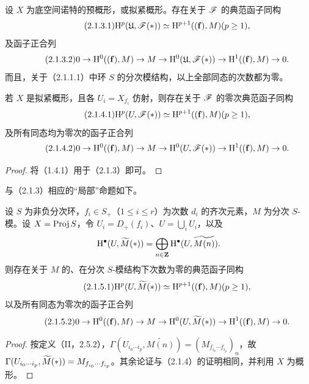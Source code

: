 设 $X$ 为底空间诺特的预概形，或拟紧概形。存在关于 $\mathscr F$ 的典范函子同构
\begin{equation}\tag{2.1.3.1}
\mathrm H^p(\mathfrak U,\mathscr F(*))\simeq\mathrm H^{p+1}((\mathbf f),M)(p\geq1),
\end{equation}
及函子正合列
\begin{equation}\tag{2.1.3.2}
0\to\mathrm H^0((\mathbf f),M)\to M\to\mathrm H^0(\mathfrak U,\mathscr F(*))
\to\mathrm H^1((\mathbf f),M)\to0.
\end{equation}
而且，关于（2.1.1.1）中环 $S$ 的分次模结构，以上全部同态的次数都为零。

若 $X$ 是拟紧概形，且各 $U_i=X_{f_i}$ 仿射，则存在关于 $\mathscr F$ 的零次典范函子同构
\begin{equation}\tag{2.1.4.1}
\mathrm H^p(U,\mathscr F(*))\simeq\mathrm H^{p+1}((\mathbf f),M)(p\geq1),
\end{equation}
及所有同态均为零次的函子正合列
\begin{equation}\tag{2.1.4.2}
0\to\mathrm H^0((\mathbf f),M)\to M\to\mathrm H^0(U,\mathscr F(*))
\to\mathrm H^1((\mathbf f),M)\to0.
\end{equation}
\begin{proof}将（1.4.1）用于（2.1.3）即可。\end{proof}
与（2.1.3）相应的“局部”命题如下。

设 $S$ 为非负分次环，$f_i\in S_+$（$1\leq i\leq r$）为次数 $d_i$ 的齐次元素，$M$ 为分次 $S$-模。设 $X=\operatorname{Proj} S$，令 $U_i=D_+(f_i)$、$U=\bigcup_iU_i$，以及
\[
\mathrm H^\bullet(U,\widetilde{M}(*))=\bigoplus_{n\in\mathbf Z}\mathrm H^\bullet(U,\widetilde{M(n)}).
\]
则存在关于 $M$ 的、在分次 $S$-模结构下次数为零的典范函子同构
\begin{equation}\tag{2.1.5.1}
\mathrm H^p(U,\widetilde{M}(*))\simeq\mathrm H^{p+1}((\mathbf f),M)(p\geq1),
\end{equation}
以及所有同态为零次的函子正合列
\begin{equation}\tag{2.1.5.2}
0\to\mathrm H^0((\mathbf f),M)\to M\to\mathrm H^0(U,\widetilde{M}(*))
\to\mathrm H^1((\mathbf f),M)\to0.
\end{equation}
\begin{proof}
\begin{sloppypar}
按定义（II，2.5.2），$\Gamma(U_{i_0\cdots i_p},\widetilde{M(n)})=(M_{f_{i_0}\cdots f_{i_p}})_n$，故
$\Gamma(U_{i_0\cdots i_p},\widetilde{M}(*))=M_{f_{i_0}\cdots f_{i_p}}$。其余论证与（2.1.4）的证明相同，并利用 $X$ 为概形。
\end{sloppypar}
\end{proof}


